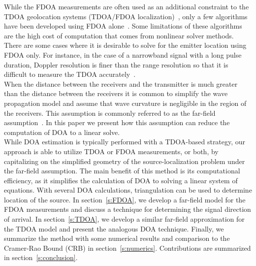 While the FDOA measurements are often used as an additional constraint to the TDOA geolocation systems (TDOA/FDOA localization)~\cite{Ho1997}, only a few algorithms have been developed using FDOA alone~\cite{Cameron,Jinzhou2012}. Some limitations of these algorithms are the high cost of computation that comes from nonlinear solver methods. There are some cases where it is desirable to solve for the emitter location using FDOA only. For instance, in the case of a narrowband signal with a long pulse duration, Doppler resolution is finer than the range resolution so that it is difficult to measure the TDOA accurately~\cite{Cheney2009,Mason2005,Jinzhou2012}. \\

When the distance between the receivers and the transmitter is much greater than the distance between the receivers it is common to simplify the wave propagation model and assume that wave curvature is negligible in the region of the receivers. This assumption is commonly referred to as the far-field assumption~\cite{Cheney2009}. In this paper we present how this assumption can reduce the computation of DOA to a linear solve. \\

While DOA estimation is typically performed with a TDOA-based strategy, our approach is able to utilize TDOA or FDOA measurements, or both, by capitalizing on the simplified geometry of the source-localization problem under the far-field assumption. The main benefit of this method is its computational efficiency, as it simplifies the calculation of DOA to solving a linear system of equations. With several DOA calculations, triangulation can be used to determine location of the source. In section~\ref{s:FDOA}, we develop a far-field model for the FDOA measurements and discuss a technique for determining the signal direction of arrival. In section~\ref{s:TDOA}, we develop a similar far-field approximation for the TDOA model and present the analogous DOA technique. Finally, we summarize the method with some numerical results and comparison to the Cramer-Rao Bound (CRB) in section~\ref{s:numerics}. Contributions are summarized in section~\ref{s:conclusion}.
